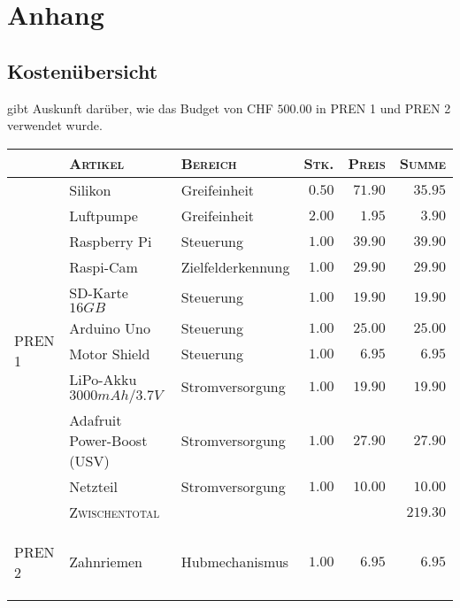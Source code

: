 \pagestyle{plain}
\appendix

\section{Anhang}
\label{app:anhang}

\subsection{Kostenübersicht}

 gibt Auskunft darüber, wie das Budget von CHF $500.00$ in PREN 1 und PREN 2 verwendet wurde.

\begin{table}
    \footnotesize
    \centering
    \begin{tabular}{l|l|l|r|r|r}
        & \textsc{Artikel} & \textsc{Bereich} & \textsc{Stk.} & \textsc{Preis} & \textsc{Summe} \\
        \hline
        \multirow{11}{*}{\begin{turn}{90}\textsc{PREN 1}\end{turn}}
            & Silikon & Greifeinheit & $0.50$ & $71.90$ & $35.95$ \\
            & Luftpumpe & Greifeinheit & $2.00$ & $1.95$ & $3.90$ \\
            & Raspberry Pi & Steuerung & $1.00$ & $39.90$ & $39.90$ \\
            & Raspi-Cam & Zielfelderkennung & $1.00$ & $29.90$ & $29.90 $ \\
            & SD-Karte $16 GB$ & Steuerung & $1.00$ & $19.90$ & $19.90$ \\
            & Arduino Uno & Steuerung & $1.00$ & $25.00$ & $25.00$ \\
            & Motor Shield & Steuerung & $1.00$ & $6.95$ & $6.95$ \\
            & LiPo-Akku $3000mAh/3.7V$ & Stromversorgung & $1.00$ & $19.90$ & $19.90$ \\
            & Adafruit Power-Boost (USV) & Stromversorgung & $1.00$ & $27.90$ & $27.90$ \\
            & Netzteil & Stromversorgung & $1.00$ & $10.00$ & $10.00$ \\
            & \textsc{Zwischentotal} & & & & $\boldsymbol{219.30}$ \\
            \hline
        \multirow{24}{*}{\begin{turn}{90}\textsc{PREN 2}\end{turn}}
            & Zahnriemen & Hubmechanismus & $1.00$ & $6.95$ & $6.95$ \\

\end{tabular}
\end{table}
